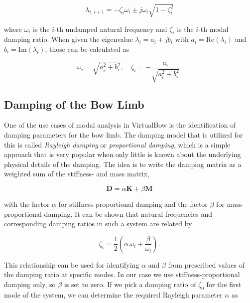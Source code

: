 \begin{equation}
\lambda_{i,\,i+1} = -\zeta_{i}\omega_{i} \pm j\omega_{i}\sqrt{1 - \zeta_{i}^2}
\end{equation}

where $\omega_{i}$ is the $i$-th undamped natural frequency and $\zeta_{i}$ is the $i$-th modal damping ratio.
When given the eigenvalue $\lambda_{i} = a_{i} + jb_{i}$ with $a_{i} = \mathrm{Re}(\lambda_i)$ and $b_{i} = \mathrm{Im}(\lambda_i)$, those can be calculated as

\begin{equation}
\omega_{i} = \sqrt{a_{i}^2 + b_{i}^2}, \quad \zeta_{i} = -\frac{a_{i}}{\sqrt{a_{i}^2 + b_{i}^2}}.
\end{equation}

\subsection{Damping of the Bow Limb}
\label{sec:rayleigh-damping}

One of the use cases of modal analysis in VirtualBow is the identification of damping parameters for the bow limb.
The damping model that is utilized for this is called \textit{Rayleigh damping} or \textit{proportional damping}, which is a simple approach that is very popular when only little is known about the underlying physical details of the damping.
The idea is to write the damping matrix as a weighted sum of the stiffness- and mass matrix,

\begin{equation}
\boldsymbol{D} = \alpha\boldsymbol{K} + \beta\boldsymbol{M}
\end{equation}

with the factor $\alpha$ for stiffness-proportional damping and the factor $\beta$ for mass-proportional damping.
It can be shown \cite{bib:rayleigh-damping} that natural frequencies and corresponding damping ratios in such a system are related by 

\begin{equation}
\zeta_{i} = \frac{1}{2}\left(\alpha\,\omega_{i} + \frac{\beta}{\omega_{i}}\right).
\end{equation}

This relationship can be used for identifying $\alpha$ and $\beta$ from prescribed values of the damping ratio at specific modes.
In our case we use stiffness-proportional damping only, so $\beta$ is set to zero.
If we pick a damping ratio of $\zeta_{0}$ for the first mode of the system, we can determine the required Rayleigh parameter $\alpha$ as

